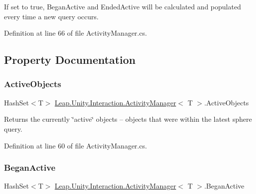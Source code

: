 If set to true, Began\+Active and Ended\+Active will be calculated and populated every time a new query occurs. 



Definition at line 66 of file Activity\+Manager.\+cs.



\subsection{Property Documentation}
\mbox{\label{class_leap_1_1_unity_1_1_interaction_1_1_activity_manager_a6eb798f1ce61155a8ae329cf61d750df}} 
\subsubsection{\texorpdfstring{ActiveObjects}{ActiveObjects}}
{\footnotesize\ttfamily Hash\+Set$<$T$>$ \mbox{\hyperlink{class_leap_1_1_unity_1_1_interaction_1_1_activity_manager}{Leap.\+Unity.\+Interaction.\+Activity\+Manager}}$<$ T $>$.Active\+Objects\hspace{0.3cm}{\ttfamily [get]}}



Returns the currently \char`\"{}active\char`\"{} objects -- objects that were within the latest sphere query. 



Definition at line 60 of file Activity\+Manager.\+cs.

\mbox{\label{class_leap_1_1_unity_1_1_interaction_1_1_activity_manager_ac60a3543eabcf6162b4ded1d28e5fc0b}} 
\subsubsection{\texorpdfstring{BeganActive}{BeganActive}}
{\footnotesize\ttfamily Hash\+Set$<$T$>$ \mbox{\hyperlink{class_leap_1_1_unity_1_1_interaction_1_1_activity_manager}{Leap.\+Unity.\+Interaction.\+Activity\+Manager}}$<$ T $>$.Began\+Active\hspace{0.3cm}{\ttfamily [get]}}



